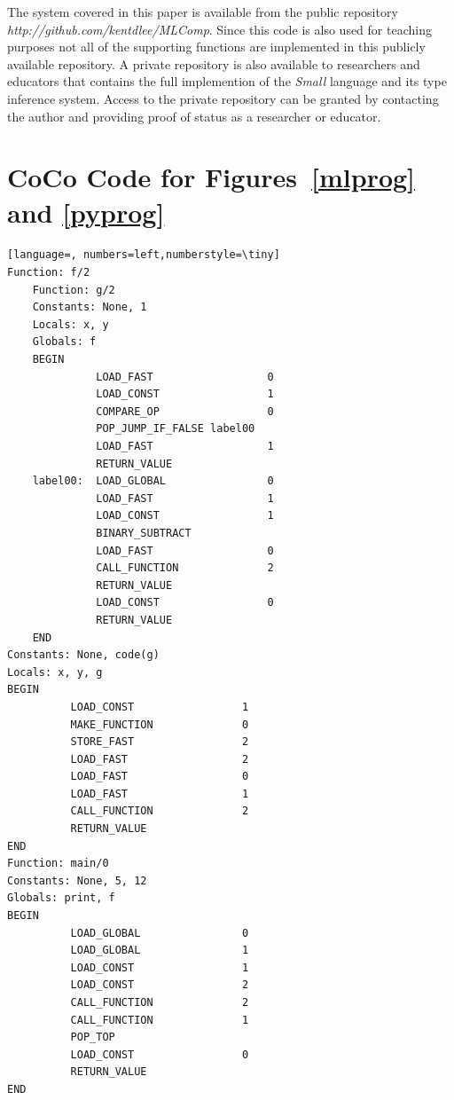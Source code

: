 \documentclass[10pt]{luthercs}
\begin{document}
The system covered in this paper is available from the public repository {\em http://github.com/kentdlee/MLComp}. Since this code is also used for teaching purposes not all of the supporting functions are implemented in this publicly available repository. A private repository is also available to researchers and educators that contains the full implemention of the {\em Small} language and its type inference system. Access to the private repository can be granted by contacting the author and providing proof of status as a researcher or educator.
 
\newpage
\appendix
\section{CoCo Code for Figures~\ref{mlprog} and \ref{pyprog}}
\label{cocoprog}
{\small
\begin{lstlisting}[language=, numbers=left,numberstyle=\tiny]
Function: f/2
    Function: g/2
    Constants: None, 1
    Locals: x, y
    Globals: f
    BEGIN
              LOAD_FAST                  0
              LOAD_CONST                 1
              COMPARE_OP                 0
              POP_JUMP_IF_FALSE label00
              LOAD_FAST                  1
              RETURN_VALUE
    label00:  LOAD_GLOBAL                0
              LOAD_FAST                  1
              LOAD_CONST                 1
              BINARY_SUBTRACT
              LOAD_FAST                  0
              CALL_FUNCTION              2
              RETURN_VALUE
              LOAD_CONST                 0
              RETURN_VALUE
    END
Constants: None, code(g)
Locals: x, y, g
BEGIN
          LOAD_CONST                 1
          MAKE_FUNCTION              0
          STORE_FAST                 2
          LOAD_FAST                  2
          LOAD_FAST                  0
          LOAD_FAST                  1
          CALL_FUNCTION              2
          RETURN_VALUE
END
Function: main/0
Constants: None, 5, 12
Globals: print, f
BEGIN
          LOAD_GLOBAL                0
          LOAD_GLOBAL                1
          LOAD_CONST                 1
          LOAD_CONST                 2
          CALL_FUNCTION              2
          CALL_FUNCTION              1
          POP_TOP
          LOAD_CONST                 0
          RETURN_VALUE
END
\end{lstlisting}}
\end{document}
